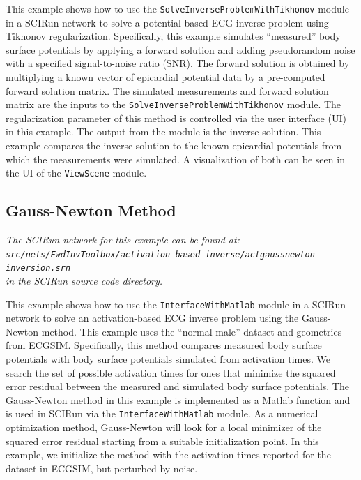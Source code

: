 This example shows how to use the {\tt SolveInverseProblemWithTikhonov} module in a SCIRun network to solve a potential-based ECG inverse problem using Tikhonov regularization. Specifically, this example simulates ``measured'' body surface potentials by applying a forward solution and adding pseudorandom noise with a specified signal-to-noise ratio (SNR). The forward solution is obtained by multiplying a known vector of epicardial potential data by a pre-computed forward solution matrix. The simulated measurements and forward solution matrix are the inputs to the {\tt SolveInverseProblemWithTikhonov} module. The regularization parameter of this method is controlled via the user interface (UI) in this example. The output from the module is the inverse solution. This example compares the inverse solution to the known epicardial potentials from which the measurements were simulated. A visualization of both can be seen in the UI of the {\tt ViewScene} module.

\subsection{Gauss-Newton Method}

\vspace{5pt}\textit{The SCIRun network for this example can be found at:\\{\tt src/nets/FwdInvToolbox/activation-based-inverse/actgaussnewton-inversion.srn}\\in the SCIRun source code directory.}\vspace{5pt}

This example shows how to use the {\tt InterfaceWithMatlab} module in a SCIRun network to solve an activation-based ECG inverse problem using the Gauss-Newton method. This example uses the ``normal male'' dataset and geometries from ECGSIM. Specifically, this method compares measured body surface potentials with body surface potentials simulated from activation times. We search the set of possible activation times for ones that minimize the squared error residual between the measured and simulated body surface potentials. The Gauss-Newton method in this example is implemented as a Matlab function and is used in SCIRun via the {\tt InterfaceWithMatlab} module. As a numerical optimization method, Gauss-Newton will look for a local minimizer of the squared error residual starting from a suitable initialization point. In this example, we initialize the method with the activation times reported for the dataset in ECGSIM, but perturbed by noise.

